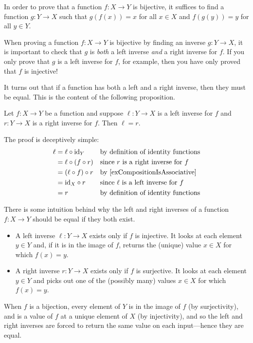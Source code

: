 \begin{strategy}
In order to prove that a function $f : X \to Y$ is bijective, it suffices to find a function $g : Y \to X$ such that $g(f(x)) = x$ for all $x \in X$ and $f(g(y)) = y$ for all $y \in Y$.
\end{strategy}

When proving a function $f : X \to Y$ is bijective by finding an inverse $g : Y \to X$, it is important to check that $g$ is \textit{both} a left inverse \textit{and} a right inverse for $f$. If you only prove that $g$ is a left inverse for $f$, for example, then you have only proved that $f$ is injective!

It turns out that if a function has both a left and a right inverse, then they must be equal. This is the content of the following proposition.

\begin{proposition}
\label{propLeftAndRightInversesAreEqual}
Let $f : X \to Y$ be a function and suppose $\ell : Y \to X$ is a left inverse for $f$ and $r : Y \to X$ is a right inverse for $f$. Then $\ell=r$.
\end{proposition}
\begin{cproof}
The proof is deceptively simple:
\begin{align*}
\ell &= \ell \circ \mathrm{id}_Y && \text{by definition of identity functions} \\
&= \ell \circ (f \circ r) && \text{since $r$ is a right inverse for $f$} \\
&= (\ell \circ f) \circ r && \text{by \Cref{exCompositionIsAssociative}} \\
&= \mathrm{id}_X \circ r && \text{since $\ell$ is a left inverse for $f$} \\
&= r && \text{by definition of identity functions}
\end{align*}
\end{cproof}

There is some intuition behind why the left and right inverses of a function $f : X \to Y$ should be equal if they both exist.
\begin{itemize}
\item A left inverse $\ell : Y \to X$ exists only if $f$ is injective. It looks at each element $y \in Y$ and, if it is in the image of $f$, returns the (unique) value $x \in X$ for which $f(x)=y$.
\item A right inverse $r : Y \to X$ exists only if $f$ is surjective. It looks at each element $y \in Y$ and picks out one of the (possibly many) values $x \in X$ for which $f(x)=y$.
\end{itemize}
When $f$ is a bijection, every element of $Y$ is in the image of $f$ (by surjectivity), and is a value of $f$ at a unique element of $X$ (by injectivity), and so the left and right inverses are forced to return the same value on each input---hence they are equal.

